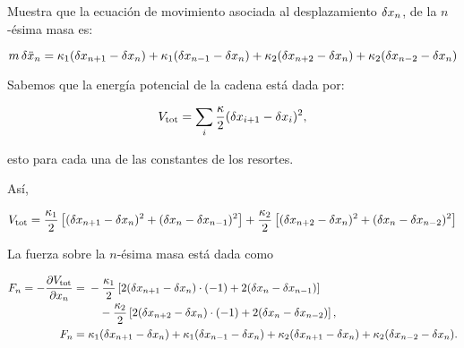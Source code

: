 \documentclass[./../main.tex]{subfiles}
\begin{document}
    \pagebreak
    \startsolution[print]

    \kant[1-2]

    \section{}

    Muestra que la ecuación de movimiento asociada al desplazamiento \(\fdif{x_{n}}\), de la \(n\)-ésima masa es:
    
    \begin{equation*}
        m\fdif{\ddot{x}_{n}} = \kappa_{1}(\fdif{x_{n + 1}} - \fdif{x_{n}}) + \kappa_{1}(\fdif{x_{n - 1}} - \fdif{x_{n}}) + \kappa_{2}(\fdif{x_{n + 2}} - \fdif{x_{n}}) + \kappa_{2}(\fdif{x_{n - 2}} - \fdif{x_{n}})
    \end{equation*}

    \startsolution[print]

            Sabemos que la energía potencial de la cadena está dada por:

            \begin{equation*}
                V_{\text{tot}} = \sum_{i}\dfrac{\kappa}{2}(\fdif{x_{i + 1}} - \fdif{x_{i}})^{2},
            \end{equation*}

            esto para cada una de las constantes de los resortes.

            Así,

            \begin{equation*}
                V_{\text{tot}} = \dfrac{\kappa_{1}}{2}\left[(\fdif{x_{n + 1}} -\fdif{x_{n}})^{2} + (\fdif{x_{n}} - \fdif{x_{n - 1}})^{2}\right]
                + \dfrac{\kappa_{2}}{2}\left[(\fdif{x_{n + 2}} - \fdif{x_{n}})^{2} + (\fdif{x_{n}} - \fdif{x_{n - 2}})^{2}\right]
            \end{equation*}

            La fuerza sobre la \(n\)-ésima masa está dada como

            \begin{align*}
                F_{n} = -\pdv{V_{\text{tot}}}{x_{n}} &= 
                \begin{multlined}[t]
                    -\dfrac{\kappa_{1}}{2}\left[2(\fdif{x_{n + 1}} - \fdif{x_{n}})\cdot (-1)
                + 2(\fdif{x_{n}} - \fdif{x_{n - 1}})\right]\\
                - \dfrac{\kappa_{2}}{2}\left[2(\fdif{x_{n + 2}} - \fdif{x_{n}})\cdot(-1) + 2(\fdif{x_{n}} - \fdif{x_{n - 2}})\right],
                \end{multlined}\\
                F_{n} &= \kappa_{1}(\fdif{x_{n + 1}} - \fdif{x_{n}}) + \kappa_{1}(\fdif{x_{n - 1}} - \fdif{x_{n}}) + \kappa_{2}(\fdif{x_{n + 1}} - \fdif{x_{n}}) + \kappa_{2}(\fdif{x_{n - 2}} - \fdif{x_{n}}).
            \end{align*}
\end{document}
